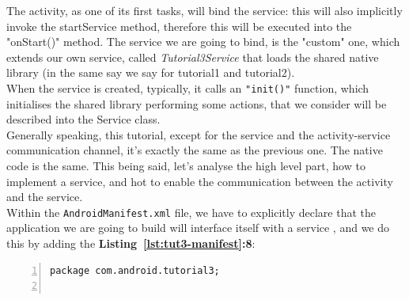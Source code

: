 \documentclass[a4paper,10pt]{article}
\newcommand{\keyword}[1]{\texttt{#1}}
\newcommand{\refl}[1]{\textbf{Listing~\ref{#1}}}
\begin{document}
\begin{multicols}{2}
The activity, as one of its first tasks, will bind the service: this will also
implicitly invoke the startService method, therefore this will be executed into
the "onStart()" method. The service we are going to bind, is the "custom" one,
which extends our own service, called \textit{Tutorial3Service} that loads the
shared native library (in the same say we say for tutorial1 and tutorial2).\\
When the service is created, typically, it calls an \texttt{"init()"} function,
which initialises the shared library performing some actions, that we consider
will be described into the Service class.\\
Generally speaking, this tutorial, except for the service and the
activity-service communication channel, it's exactly the same as the previous
one. The native code is the same. This being said, let's analyse
the high level part, how to implement a service, and hot to enable the
communication between the activity and the service.\\
Within the \keyword{AndroidManifest.xml} file, we have to explicitly declare
that the application we are going to build will interface itself with a service
, and we do this by adding the \refl{lst:tut3-manifest}\textbf{:8}:
\begin{lstlisting}[language=xml,
		   columns=fullflexible,
		   showstringspaces=false,
		   xleftmargin=15pt,
		   frame = l,
		   numbers=left,
		   commentstyle=\color{gray}\upshape,
		   caption=AndroidManifest.xml,
		   label=lst:tut3-manifest]
package com.android.tutorial3;


\end{lstlisting}
\end{multicols}
\end{document}
